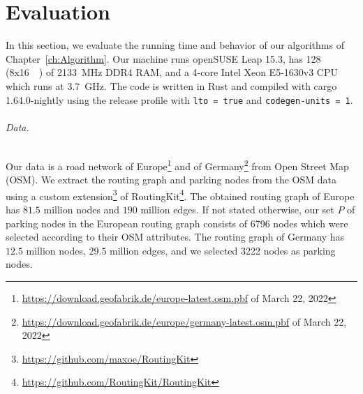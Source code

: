 
\chapter{Evaluation\label{ch:Evaluation}}
In this section, we evaluate the running time and behavior of our algorithms of Chapter~\ref{ch:Algorithm}. Our machine runs openSUSE Leap 15.3, has \SI{128}{\giga\byte} (8x\SI{16}{\giga\byte}) of \SI{2133}{\mega\hertz} DDR4 RAM, and a 4-core Intel Xeon E5-1630v3 CPU which runs at \SI{3.7}{\giga\hertz}. The code is written in Rust and compiled with cargo 1.64.0-nightly using the release profile with \texttt{lto~=~true} and \texttt{codegen-units~=~1}.

\subparagraph{Data.} Our data is a road network of Europe\footnote{\url{https://download.geofabrik.de/europe-latest.osm.pbf} of March 22, 2022} and of Germany\footnote{\url{https://download.geofabrik.de/europe/germany-latest.osm.pbf} of March 22, 2022} from Open Street Map (OSM). We extract the routing graph and parking nodes from the OSM data using a custom extension\footnote{\url{https://github.com/maxoe/RoutingKit}} of RoutingKit\footnote{\url{https://github.com/RoutingKit/RoutingKit}}. The obtained routing graph of Europe has $81.5$ million nodes and $190$ million edges. If not stated otherwise, our set $P$ of parking nodes in the European routing graph consists of \num{6796} nodes which were selected according to their OSM attributes. The routing graph of Germany has $12.5$ million nodes, $29.5$ million edges, and we selected \num{3222} nodes as parking nodes.

